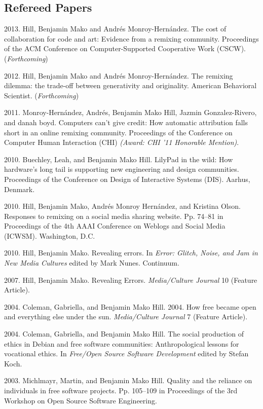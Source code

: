 \documentclass[10pt]{article}
\newenvironment{cvlist}{
\begin{list}{}{\leftmargin=3.0em \itemindent=-3.0em}
  \setlength{\itemsep}{0pt}
  \setlength{\parskip}{0em}
  \setlength{\parsep}{1em}
  \setlength{\parindent}{0em}}
{\vspace{1em}
\end{list}}
\begin{document}
\subsection{Refereed Papers}
\begin{cvlist}
\item 2013. Hill, Benjamin Mako and Andrés Monroy-Hernández. The cost
  of collaboration for code and art: Evidence from a remixing
  community.  Proceedings of the ACM Conference on Computer-Supported
  Cooperative Work (CSCW). (\emph{Forthcoming})
\item 2012. Hill, Benjamin Mako and Andrés Monroy-Hernández.
  The remixing dilemma: the trade-off between generativity and
  originality. American Behavioral Scientist. (\emph{Forthcoming})
\item 2011. Monroy-Hernández, Andrés, Benjamin Mako Hill, Jazmin
  Gonzalez-Rivero, and danah boyd. Computers can't give credit: How
  automatic attribution falls short in an online remixing
  community. Proceedings of the Conference on Computer Human
  Interaction (CHI) \emph{(Award: CHI '11 Honorable Mention)}.
\item 2010. Buechley, Leah, and Benjamin Mako Hill. LilyPad in the wild:
  How hardware's long tail is supporting new engineering and design
  communities. Proceedings of the Conference on Design of Interactive
  Systems (DIS). Aarhus, Denmark.
\item 2010. Hill, Benjamin Mako, Andrés Monroy Hernández, and Kristina
  Olson. Responses to remixing on a social media sharing
  website. Pp. 74--81 in Proceedings of the 4th AAAI Conference on
  Weblogs and Social Media (ICWSM). Washington, D.C.
\item 2010. Hill, Benjamin Mako. Revealing errors. In \emph{Error:
    Glitch, Noise, and Jam in New Media Cultures} edited by Mark
  Nunes. Continuum. %
\item 2007. Hill, Benjamin Mako. Revealing Errors. \emph{Media/Culture
    Journal} 10 (Feature Article).
\item 2004. Coleman, Gabriella, and Benjamin Mako Hill. 2004. How free
  became open and everything else under the sun. \emph{Media/Culture
    Journal} 7 (Feature Article).
\item 2004. Coleman, Gabriella, and Benjamin Mako Hill. The social
  production of ethics in Debian and free software communities:
  Anthropological lessons for vocational ethics. In \emph{Free/Open
    Source Software Development} edited by Stefan Koch.
\item 2003. Michlmayr, Martin, and Benjamin Mako Hill. Quality and the
  reliance on individuals in free software projects. Pp. 105--109 in
  Proceedings of the 3rd Workshop on Open Source Software Engineering.
\end{cvlist}
\end{document}
